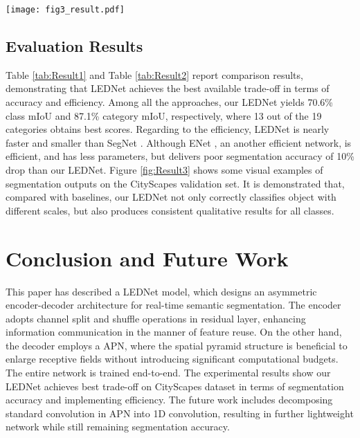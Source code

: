 \documentclass{article}
\begin{document}
\begin{figure*}[!t]
\centerline{\texttt{[image: fig3\_result.pdf]}}
\caption{The visual comparison on CityScapes val dataset. From left to right are input images, ground truth, segmentation outputs from SegNet \cite{Badrinarayanan2015Segnet}, ENet \cite{Paszke2016enet}, ERFNet \cite{Romera2018erfnet}, ESPNet \cite{Mehta2018espnet}, ICNet \cite{Zhao2018ICnet}, CGNet \cite{wu2018cgnet}, and our LEDNet. (Best viewed in color)} \label{fig:Result3}
\end{figure*}

\subsection{Evaluation Results}\label{sec:Results}

Table \ref{tab:Result1} and Table \ref{tab:Result2} report comparison results, demonstrating that LEDNet achieves the best available trade-off in terms of accuracy and efficiency. Among all the approaches, our LEDNet yields 70.6\% class mIoU and 87.1\% category mIoU, respectively, where 13 out of the 19 categories obtains best scores. Regarding to the efficiency, LEDNet is nearly  faster and  smaller than SegNet \cite{Badrinarayanan2015Segnet}. Although ENet \cite{Paszke2016enet}, an another efficient network, is  efficient, and has   less parameters, but delivers poor segmentation accuracy of 10\% drop than our LEDNet. Figure \ref{fig:Result3} shows some visual examples of segmentation outputs on the CityScapes validation set. It is demonstrated that, compared with baselines, our LEDNet not only correctly classifies object with different scales, but also produces consistent qualitative results for all classes.

\section{Conclusion and Future Work}\label{sec:conclusion}

This paper has described a LEDNet model, which designs an asymmetric encoder-decoder architecture for real-time semantic segmentation. The encoder adopts channel split and shuffle operations in residual layer, enhancing information communication in the manner of feature reuse. On the other hand, the decoder employs a APN, where the spatial pyramid structure is beneficial to enlarge receptive fields without introducing significant computational budgets. The entire network is trained end-to-end. The experimental results show our LEDNet achieves best trade-off on CityScapes dataset in terms of segmentation accuracy and implementing efficiency. The future work includes decomposing standard convolution in APN into 1D convolution, resulting in further lightweight network while still remaining segmentation accuracy.





\end{document}
